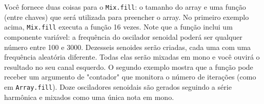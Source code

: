 Você fornece duas coisas para o \texttt{Mix.fill}: o tamanho do array e uma função (entre chaves) que será utilizada para preencher o array. No primeiro exemplo acima, \texttt{Mix.fill} executa a função 16 vezes. Note que a função inclui um componente variável: a frequência do oscilador senoidal poderá ser qualquer número entre 100 e 3000. Dezesseis senoides serão criadas, cada uma com uma frequência aleatória diferente. Todas elas serão mixadas em mono e você ouvirá o resultado no seu canal esquerdo.
O segundo exemplo mostra que a função pode receber um argumento de "contador" que monitora o número de iterações (como em \texttt{Array.fill}). Doze osciladores senoidais são gerados seguindo a série harmônica e mixados como uma única nota em mono.
